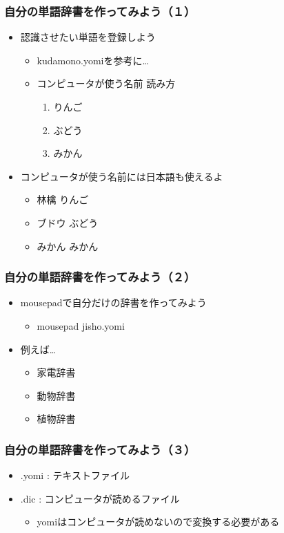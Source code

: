 \documentclass[14pt]{beamer}
\begin{document}
\begin{frame}
  \frametitle{自分の単語辞書を作ってみよう（１）}
  \begin{itemize}
    \item 認識させたい単語を登録しよう
          \begin{itemize}
            \item kudamono.yomiを参考に…
            \item \<コンピュータが使う名前\> \<読み方\>
                  \renewcommand{\theenumi}{\roman{enumi}}
                  \begin{enumerate}
                    \item りんご
                    \item ぶどう
                    \item みかん
                  \end{enumerate}
          \end{itemize}
    \item \<コンピュータが使う名前\>には日本語も使えるよ
          \begin{itemize}
            \item 林檎 りんご
            \item ブドウ ぶどう
            \item みかん みかん
          \end{itemize}
  \end{itemize}
\end{frame}

\begin{frame}
  \frametitle{自分の単語辞書を作ってみよう（２）}
  \begin{itemize}
    \item mousepadで自分だけの辞書を作ってみよう
          \begin{itemize}
            \item mousepad jisho.yomi
          \end{itemize}
    \item 例えば…
          \begin{itemize}
            \item 家電辞書
            \item 動物辞書
            \item 植物辞書
          \end{itemize}
  \end{itemize}
\end{frame}

\begin{frame}
  \frametitle{自分の単語辞書を作ってみよう（３）}
  \begin{itemize}
    \item .yomi : テキストファイル
    \item .dic : コンピュータが読めるファイル
          \begin{itemize}
            \item yomiはコンピュータが読めないので変換する必要がある
          \end{itemize}
  \end{itemize}
\end{frame}
\end{document}
